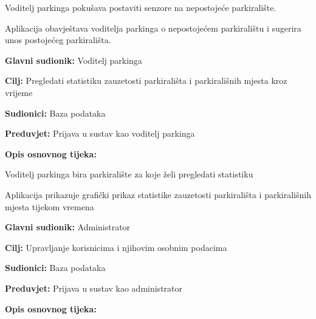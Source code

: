 {\begin{packed_item}
\begin{packed_item}
\begin{packed_enum}
		\end{packed_enum}
		\item[3.a] Voditelj parkinga pokušava postaviti senzore na nepostojeće parkiralište.
		\item[] \begin{packed_enum}
			
			\item Aplikacija obavještava voditelja parkinga o nepostojećem parkiralištu i sugerira unos postojećeg parkirališta.
			
		\end{packed_enum}
		
	\end{packed_item}
	
\end{packed_item}

\noindent {}
\begin{packed_item}
	
	\item \textbf{Glavni sudionik: }Voditelj parkinga
	\item  \textbf{Cilj:} Pregledati statistiku zauzetosti parkirališta i parkirališnih mjesta kroz vrijeme
	\item  \textbf{Sudionici:} Baza podataka
	\item  \textbf{Preduvjet:} Prijava u sustav kao voditelj parkinga
	\item  \textbf{Opis osnovnog tijeka:}
	
	\item[] \begin{packed_enum}
		
		\item Voditelj parkinga bira parkiralište za koje želi pregledati statistiku
		\item Aplikacija prikazuje grafički prikaz statistike zauzetosti parkirališta i parkirališnih mjesta tijekom vremena
		
	\end{packed_enum}
	
\end{packed_item}

\noindent {}
\begin{packed_item}
	
	\item \textbf{Glavni sudionik: }Administrator
	\item  \textbf{Cilj:} Upravljanje korisnicima i njihovim osobnim podacima
	\item  \textbf{Sudionici:} Baza podataka
	\item  \textbf{Preduvjet:} Prijava u sustav kao administrator
	\item  \textbf{Opis osnovnog tijeka:}
	

\end{packed_item}}

